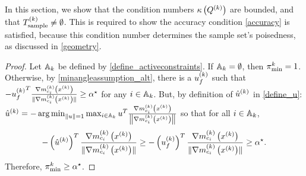 In this section, we show that the condition numbers ${\kappa}\left({Q^{(k)}}\right)$ are bounded, and that ${T_{\text{sample}}^{(k)}} \ne \emptyset$.
This is required to show the accuracy condition \cref{accuracy} is satisfied,
because this condition number determines the sample set's poisedness, as discussed in \cref{geometry}.



\begin{proof}

Let ${\mathbb A_{k}}$ be defined by \cref{define_activeconstraints}.
If ${\mathbb A_{k}} = \emptyset$, then ${\pi^k_{\textrm{min}}} = 1$.
Otherwise, by \cref{minangleassumption_alt}, there is a ${u^{(k)}_f}$ such that 
$-{u^{(k)}_f}^T\frac{{\nabla m_{c_i}^{(k)}\left(x^{(k)}\right)}}{\|{\nabla m_{c_i}^{(k)}\left(x^{(k)}\right)}\|} \ge { \alpha^{\star} }$ for any $i \in {\mathbb A_{k}}$.
But, by definition of ${{\hat u}^{(k)}}$ in \cref{define_u}:
${{\hat u}^{(k)}} = -\operatorname*{arg\,min}_{\|u\| = 1} \max_{i \in {\mathbb A_{k}}} u^T\frac{{\nabla m_{c_i}^{(k)}\left(x^{(k)}\right)}}{\left\|{\nabla m_{c_i}^{(k)}\left(x^{(k)}\right)}\right\|}$
so that for all $i \in {\mathbb A_{k}}$,
\begin{align*}
-\left({{\hat u}^{(k)}}\right)^T\frac{{\nabla m_{c_i}^{(k)}\left(x^{(k)}\right)}}{\|{\nabla m_{c_i}^{(k)}\left(x^{(k)}\right)}\|}  \ge -\left({u^{(k)}_f}\right)^T\frac{{\nabla m_{c_i}^{(k)}\left(x^{(k)}\right)}}{\|{\nabla m_{c_i}^{(k)}\left(x^{(k)}\right)}\|} \ge { \alpha^{\star} }.
\end{align*}
Therefore, ${\pi^k_{\textrm{min}}} \ge { \alpha^{\star} }$.
\end{proof}

